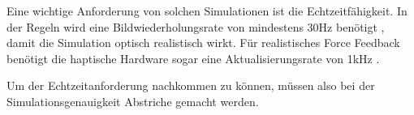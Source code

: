 
Eine wichtige Anforderung von solchen Simulationen ist die Echtzeitfähigkeit. In der Regeln wird eine Bildwiederholungsrate von mindestens 30Hz benötigt %
, damit die Simulation optisch realistisch wirkt. %
Für realistisches Force Feedback benötigt die haptische Hardware sogar eine Aktualisierungsrate von 1kHz \cite{SimUpdate}. 

Um der Echtzeitanforderung nachkommen zu können, müssen also bei der Simulationsgenauigkeit Abstriche gemacht werden. %


